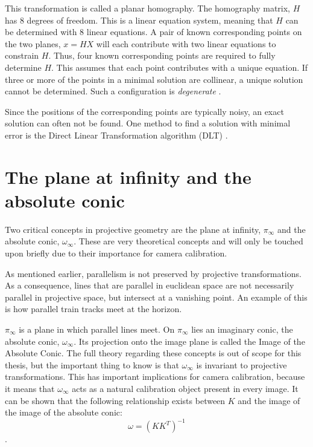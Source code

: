 This transformation is called a planar homography. The homography matrix, $H$ has 8 degrees of freedom. 
This is a linear equation system, meaning that $H$ can be determined with 8 linear equations.
A pair of known corresponding points on the two planes, $x=HX$ will each contribute with two linear equations to constrain $H$.
Thus, four known corresponding points are required to fully determine $H$.
This assumes that each point contributes with a unique equation.
If three or more of the points in a minimal solution are collinear, a unique solution cannot be determined.
Such a configuration is \textit{degenerate} \cite[p. 91-92]{hartley-zisserman}. 

Since the positions of the corresponding points are typically noisy, an exact solution can often not be found.
One method to find a solution with minimal error is the Direct Linear Transformation algorithm (DLT) \cite{homography-estimation}. 

\section{The plane at infinity and the absolute conic} \label{ac}
Two critical concepts in projective geometry are the plane at infinity, $\pi_{\infty}$ and the absolute conic, $\omega_{\infty}$.
These are very theoretical concepts and will only be touched upon briefly due to their importance for camera calibration.

As mentioned earlier, parallelism is not preserved by projective transformations. 
As a consequence, lines that are parallel in euclidean space are not necessarily parallel in projective space, but intersect at a vanishing point.
An example of this is how parallel train tracks meet at the horizon.

$\pi_{\infty}$ is a plane in which parallel lines meet. 
On $\pi_{\infty}$ lies an imaginary conic, the absolute conic, $\omega_{\infty}$.
Its projection onto the image plane is called the Image of the Absolute Conic.
The full theory regarding these concepts is out of scope for this thesis, but the important thing to know is that $\omega_{\infty}$ is invariant to projective transformations.
This has important implications for camera calibration, because it means that $\omega_{\infty}$ acts as a natural calibration object present in every image.
It can be shown that the following relationship exists between $K$ and the image of the image of the absolute conic:
\begin{equation}\label{eq:conic_k}
	\omega = (KK^T)^{-1}
\end{equation}
\cite[p. 210]{hartley-zisserman}. 

